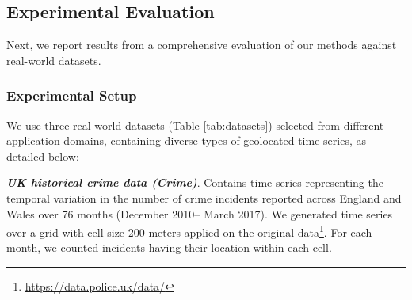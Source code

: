 \subsection{Experimental Evaluation}
\label{sec:exp}

Next, we report results from a comprehensive evaluation of our methods against real-world datasets.

\subsubsection{Experimental Setup}
\label{subsec:evaluation_setup}

\vspace{2mm}

We use three real-world datasets (Table \ref{tab:datasets}) selected from different application domains, containing diverse types of geolocated time series, as detailed below:

\begin{table}[t]
	\centering
	\caption{Datasets and parameters used in the experiments.}
	\vspace{-10pt}
	\begin{small}
	\centering
	\end{small}
	\label{tab:datasets}
\end{table}

\vspace{2mm}

\noindent \emph{\textbf{UK historical crime data (Crime)}}. Contains time series representing the temporal variation in the number of crime incidents reported across England and Wales over 76 months (December 2010-- March 2017). We generated time series over a grid with cell size 200 meters applied on the original data\footnote{\url{https://data.police.uk/data/}}. For each month, we counted incidents having their location within each cell.

